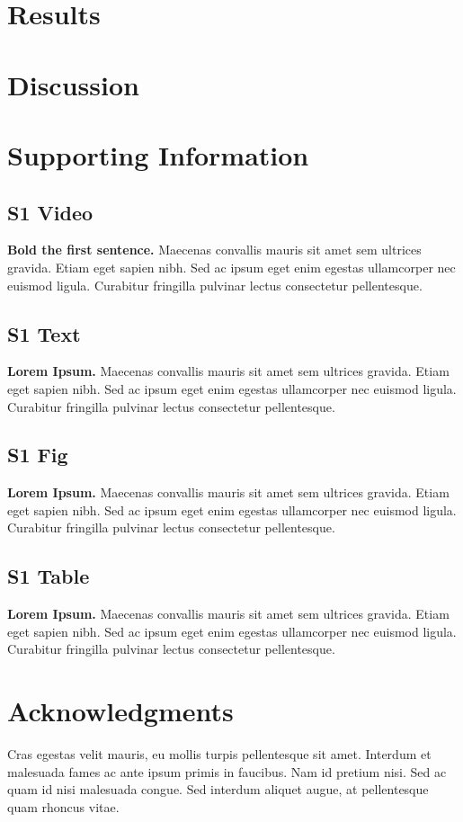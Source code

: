 \documentclass[10pt,letterpaper]{article}
\begin{document}
\section*{Results}

\section*{Discussion}

\section*{Supporting Information}

\subsection*{S1 Video}
\label{S1_Video}
{\bf Bold the first sentence.}  Maecenas convallis mauris sit amet sem ultrices gravida. Etiam eget sapien nibh. Sed ac ipsum eget enim egestas ullamcorper nec euismod ligula. Curabitur fringilla pulvinar lectus consectetur pellentesque.

\subsection*{S1 Text}
\label{S1_Text}
{\bf Lorem Ipsum.} Maecenas convallis mauris sit amet sem ultrices gravida. Etiam eget sapien nibh. Sed ac ipsum eget enim egestas ullamcorper nec euismod ligula. Curabitur fringilla pulvinar lectus consectetur pellentesque.

\subsection*{S1 Fig}
\label{S1_Fig}
{\bf Lorem Ipsum.} Maecenas convallis mauris sit amet sem ultrices gravida. Etiam eget sapien nibh. Sed ac ipsum eget enim egestas ullamcorper nec euismod ligula. Curabitur fringilla pulvinar lectus consectetur pellentesque.

\subsection*{S1 Table}
\label{S1_Table}
{\bf Lorem Ipsum.} Maecenas convallis mauris sit amet sem ultrices gravida. Etiam eget sapien nibh. Sed ac ipsum eget enim egestas ullamcorper nec euismod ligula. Curabitur fringilla pulvinar lectus consectetur pellentesque.

\section*{Acknowledgments}
Cras egestas velit mauris, eu mollis turpis pellentesque sit amet. Interdum et malesuada fames ac ante ipsum primis in faucibus. Nam id pretium nisi. Sed ac quam id nisi malesuada congue. Sed interdum aliquet augue, at pellentesque quam rhoncus vitae.

\nolinenumbers


{}
\end{document}
